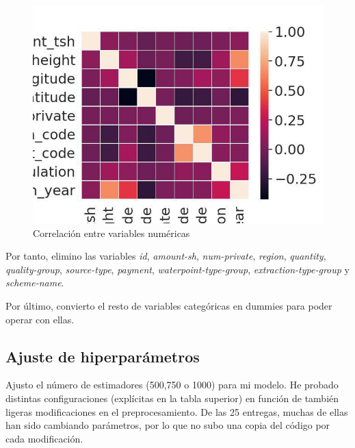  \begin{figure}[H] %
	\centering
	\includegraphics[scale=0.4]{correlaciones.png}  %
	\caption{Correlación entre variables numéricas} 
	\label{fig:correlaciones}
\end{figure}

Por tanto, elimino las variables \textit{id}, \textit{amount-sh}, \textit{num-private}, \textit{region}, \textit{quantity}, \textit{quality-group}, \textit{source-type}, \textit{payment}, \textit{waterpoint-type-group}, \textit{extraction-type-group} y \textit{scheme-name}.

Por último, convierto el resto de variables categóricas en dummies para poder operar con ellas.

\subsection{Ajuste de hiperparámetros}

Ajusto el número de estimadores (500,750 o 1000) para mi modelo. He probado distintas configuraciones (explícitas en la tabla superior) en función de también ligeras modificaciones en el preprocesamiento. De las 25 entregas, muchas de ellas han sido cambiando parámetros, por lo que no subo una copia del código por cada modificación.

